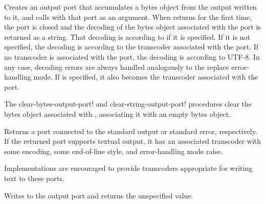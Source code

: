 \begin{entry}{%
}
   
Creates an output port that accumulates a bytes object from the output
written to it, and calls  with that port as an argument.
When  returns for the first time, the port is closed and the
decoding of the bytes object associated with the port is returned as
a string.  That decoding is according to
 if it is specified.  If it is not specified,
the decoding is according to the transcoder associated with the port.
If no transcoder is associated with the port, the decoding is
according to UTF-8.
In any
case, decoding errors are always handled analogously to the {\cf
  replace} error-handling mode.
If  is specified, it also becomes the transcoder
associated with the port.
\end{entry}

\begin{entry}{%
}

The {\cf clear-bytes-output-port!} and {\cf clear-string-output-port!}
procedures clear the bytes object associated with ,
associating it with an empty bytes object.
\end{entry}

\begin{entry}{%
}
   
Returns a port connected to the standard output or standard error,
respectively. If the returned port supports textual output, it has an
associated transcoder with some encoding, some end-of-line style, and
error-handling mode {\cf raise}.

\begin{note}
  Implementations are encouraged to provide transcoders appropriate
  for writing text to these ports.
\end{note}
\end{entry}

\begin{entry}{%
}

Writes  to the output port and returns the unspecified value.
\end{entry}

